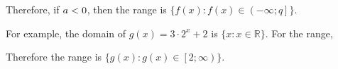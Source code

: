           \label{m39348*id251104}Therefore, if $a<{}0$, then the range is $\{f\left(x\right):f\left(x\right)\in \left(-\infty ;q\right]\}$.\par 
          \label{m39348*id251171}For example, the domain of $g\left(x\right)=3\ensuremath{\cdot}{2}^{x}+2$ is $\{x:x\in \mathbb{R}\}$.
For the range,\par 
          \label{m39348*id251239}\nopagebreak\noindent{}
          \label{m39348*id251329}Therefore the range is $\{g\left(x\right):g\left(x\right)\in \left[2;\infty \right)\}$.\par 
        \label{m39348*uid188}
